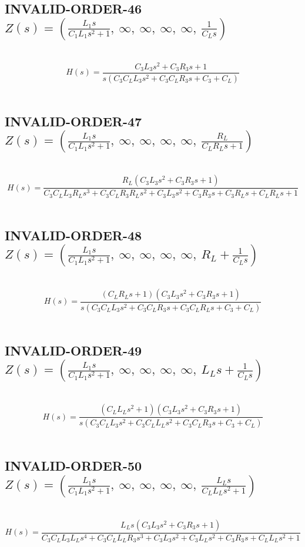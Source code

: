 \documentclass{article}
\begin{document}
\subsection{INVALID-ORDER-46 $Z(s) = \left( \frac{L_{1} s}{C_{1} L_{1} s^{2} + 1}, \  \infty, \  \infty, \  \infty, \  \infty, \  \frac{1}{C_{L} s}\right)$ } \ 
\textbf{\[H(s) = \frac{C_{3} L_{3} s^{2} + C_{3} R_{3} s + 1}{s \left(C_{3} C_{L} L_{3} s^{2} + C_{3} C_{L} R_{3} s + C_{3} + C_{L}\right)}\] } \ 
\subsection{INVALID-ORDER-47 $Z(s) = \left( \frac{L_{1} s}{C_{1} L_{1} s^{2} + 1}, \  \infty, \  \infty, \  \infty, \  \infty, \  \frac{R_{L}}{C_{L} R_{L} s + 1}\right)$ } \ 
\textbf{\[H(s) = \frac{R_{L} \left(C_{3} L_{3} s^{2} + C_{3} R_{3} s + 1\right)}{C_{3} C_{L} L_{3} R_{L} s^{3} + C_{3} C_{L} R_{3} R_{L} s^{2} + C_{3} L_{3} s^{2} + C_{3} R_{3} s + C_{3} R_{L} s + C_{L} R_{L} s + 1}\] } \ 
\subsection{INVALID-ORDER-48 $Z(s) = \left( \frac{L_{1} s}{C_{1} L_{1} s^{2} + 1}, \  \infty, \  \infty, \  \infty, \  \infty, \  R_{L} + \frac{1}{C_{L} s}\right)$ } \ 
\textbf{\[H(s) = \frac{\left(C_{L} R_{L} s + 1\right) \left(C_{3} L_{3} s^{2} + C_{3} R_{3} s + 1\right)}{s \left(C_{3} C_{L} L_{3} s^{2} + C_{3} C_{L} R_{3} s + C_{3} C_{L} R_{L} s + C_{3} + C_{L}\right)}\] } \ 
\subsection{INVALID-ORDER-49 $Z(s) = \left( \frac{L_{1} s}{C_{1} L_{1} s^{2} + 1}, \  \infty, \  \infty, \  \infty, \  \infty, \  L_{L} s + \frac{1}{C_{L} s}\right)$ } \ 
\textbf{\[H(s) = \frac{\left(C_{L} L_{L} s^{2} + 1\right) \left(C_{3} L_{3} s^{2} + C_{3} R_{3} s + 1\right)}{s \left(C_{3} C_{L} L_{3} s^{2} + C_{3} C_{L} L_{L} s^{2} + C_{3} C_{L} R_{3} s + C_{3} + C_{L}\right)}\] } \ 
\subsection{INVALID-ORDER-50 $Z(s) = \left( \frac{L_{1} s}{C_{1} L_{1} s^{2} + 1}, \  \infty, \  \infty, \  \infty, \  \infty, \  \frac{L_{L} s}{C_{L} L_{L} s^{2} + 1}\right)$ } \ 
\textbf{\[H(s) = \frac{L_{L} s \left(C_{3} L_{3} s^{2} + C_{3} R_{3} s + 1\right)}{C_{3} C_{L} L_{3} L_{L} s^{4} + C_{3} C_{L} L_{L} R_{3} s^{3} + C_{3} L_{3} s^{2} + C_{3} L_{L} s^{2} + C_{3} R_{3} s + C_{L} L_{L} s^{2} + 1}\] } \ 
\end{document}
